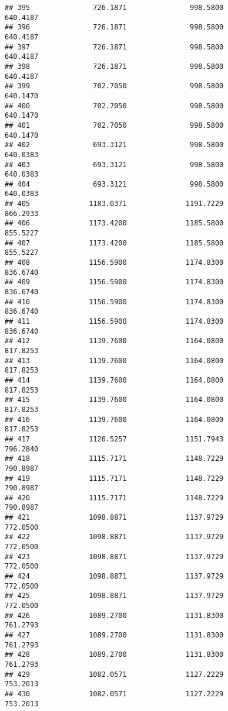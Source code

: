 \documentclass[]{article}
\begin{document}
\begin{verbatim}
## 395               726.1871               998.5800            640.4187
## 396               726.1871               998.5800            640.4187
## 397               726.1871               998.5800            640.4187
## 398               726.1871               998.5800            640.4187
## 399               702.7050               998.5800            640.1470
## 400               702.7050               998.5800            640.1470
## 401               702.7050               998.5800            640.1470
## 402               693.3121               998.5800            640.0383
## 403               693.3121               998.5800            640.0383
## 404               693.3121               998.5800            640.0383
## 405              1183.0371              1191.7229            866.2933
## 406              1173.4200              1185.5800            855.5227
## 407              1173.4200              1185.5800            855.5227
## 408              1156.5900              1174.8300            836.6740
## 409              1156.5900              1174.8300            836.6740
## 410              1156.5900              1174.8300            836.6740
## 411              1156.5900              1174.8300            836.6740
## 412              1139.7600              1164.0800            817.8253
## 413              1139.7600              1164.0800            817.8253
## 414              1139.7600              1164.0800            817.8253
## 415              1139.7600              1164.0800            817.8253
## 416              1139.7600              1164.0800            817.8253
## 417              1120.5257              1151.7943            796.2840
## 418              1115.7171              1148.7229            790.8987
## 419              1115.7171              1148.7229            790.8987
## 420              1115.7171              1148.7229            790.8987
## 421              1098.8871              1137.9729            772.0500
## 422              1098.8871              1137.9729            772.0500
## 423              1098.8871              1137.9729            772.0500
## 424              1098.8871              1137.9729            772.0500
## 425              1098.8871              1137.9729            772.0500
## 426              1089.2700              1131.8300            761.2793
## 427              1089.2700              1131.8300            761.2793
## 428              1089.2700              1131.8300            761.2793
## 429              1082.0571              1127.2229            753.2013
## 430              1082.0571              1127.2229            753.2013

\end{verbatim}
\end{document}
